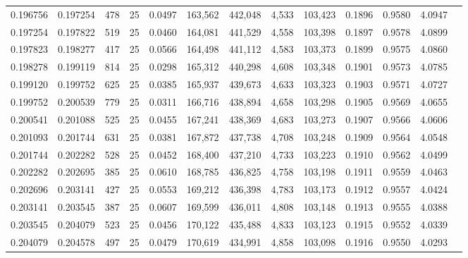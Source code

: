 \begin{tabular}{rrrrrrrrrrrrr}
0.196756 & 0.197254 &   478 &  25 &                                     0.0497 & 163,562 & 442,048 &   4,533 & 103,423 & 0.1896 & 0.9580 & 4.0947 \\
0.197254 & 0.197822 &   519 &  25 &                                     0.0460 & 164,081 & 441,529 &   4,558 & 103,398 & 0.1897 & 0.9578 & 4.0899 \\
0.197823 & 0.198277 &   417 &  25 &                                     0.0566 & 164,498 & 441,112 &   4,583 & 103,373 & 0.1899 & 0.9575 & 4.0860 \\
0.198278 & 0.199119 &   814 &  25 &                                     0.0298 & 165,312 & 440,298 &   4,608 & 103,348 & 0.1901 & 0.9573 & 4.0785 \\
0.199120 & 0.199752 &   625 &  25 &                                     0.0385 & 165,937 & 439,673 &   4,633 & 103,323 & 0.1903 & 0.9571 & 4.0727 \\
0.199752 & 0.200539 &   779 &  25 &                                     0.0311 & 166,716 & 438,894 &   4,658 & 103,298 & 0.1905 & 0.9569 & 4.0655 \\
0.200541 & 0.201088 &   525 &  25 &                                     0.0455 & 167,241 & 438,369 &   4,683 & 103,273 & 0.1907 & 0.9566 & 4.0606 \\
0.201093 & 0.201744 &   631 &  25 &                                     0.0381 & 167,872 & 437,738 &   4,708 & 103,248 & 0.1909 & 0.9564 & 4.0548 \\
0.201744 & 0.202282 &   528 &  25 &                                     0.0452 & 168,400 & 437,210 &   4,733 & 103,223 & 0.1910 & 0.9562 & 4.0499 \\
0.202282 & 0.202695 &   385 &  25 &                                     0.0610 & 168,785 & 436,825 &   4,758 & 103,198 & 0.1911 & 0.9559 & 4.0463 \\
0.202696 & 0.203141 &   427 &  25 &                                     0.0553 & 169,212 & 436,398 &   4,783 & 103,173 & 0.1912 & 0.9557 & 4.0424 \\
0.203141 & 0.203545 &   387 &  25 &                                     0.0607 & 169,599 & 436,011 &   4,808 & 103,148 & 0.1913 & 0.9555 & 4.0388 \\
0.203545 & 0.204079 &   523 &  25 &                                     0.0456 & 170,122 & 435,488 &   4,833 & 103,123 & 0.1915 & 0.9552 & 4.0339 \\
0.204079 & 0.204578 &   497 &  25 &                                     0.0479 & 170,619 & 434,991 &   4,858 & 103,098 & 0.1916 & 0.9550 & 4.0293 \\

\end{tabular}
